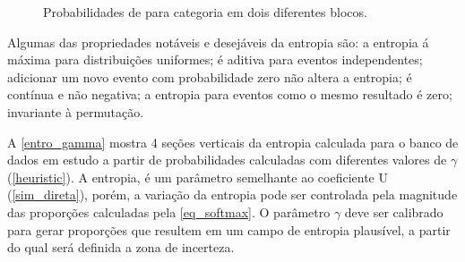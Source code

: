 \begin{figure}[H] 
\caption{Probabilidades de para categoria em dois diferentes blocos.} \label{entro_block}
     \centering
\end{figure}

Algumas das propriedades notáveis e desejáveis da entropia são: a entropia á máxima para distribuições uniformes; é aditiva para eventos independentes; adicionar um novo evento com probabilidade zero não altera a entropia; é contínua e não negativa; a entropia para eventos como o mesmo resultado é zero; invariante à permutação.

A \autoref{entro_gamma} mostra 4 seções verticais  da entropia calculada para o banco de dados em estudo a partir de probabilidades calculadas com diferentes valores de $\gamma$ (\autoref{heuristic}). A entropia, é um parâmetro semelhante ao coeficiente U (\autoref{sim_direta}), porém, a variação da entropia pode ser controlada pela magnitude das proporções calculadas pela \autoref{eq_softmax}. O parâmetro $\gamma$ deve ser calibrado para gerar proporções que resultem em um campo de entropia plausível, a partir do qual será definida a zona de incerteza. 

